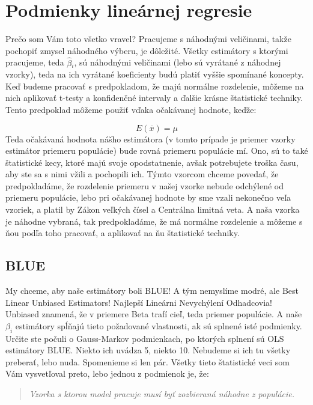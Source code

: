 \hypertarget{podmienky-lineuxe1rnej-regresie}{%
\section{Podmienky lineárnej
regresie}\label{podmienky-lineuxe1rnej-regresie}}

Prečo som Vám toto všetko vravel? Pracujeme s náhodnými veličinami,
takže pochopiť zmysel náhodného výberu, je dôležité. Všetky estimátory s
ktorými pracujeme, teda \(\hat\beta{}_i\), sú náhodnými veličinami (lebo
sú vyrátané z náhodnej vzorky), teda na ich vyrátané koeficienty budú
platiť vyššie spomínané koncepty. Keď budeme pracovať s predpokladom, že
majú normálne rozdelenie, môžeme na nich aplikovať t-testy a konfidenčné
intervaly a ďalšie krásne štatistické techniky. Tento predpoklad môžeme
použiť vďaka očakávanej hodnote, keďže:

\[E(\overline{x}) = \mu\] Teda očakávaná hodnota nášho estimátora (v
tomto prípade je priemer vzorky estimátor priemeru populácie) bude rovná
priemeru populácie mí. Ono, sú to také štatistické kecy, ktoré majú
svoje opodstatnenie, avšak potrebujete troška času, aby ste sa s nimi
vžili a pochopili ich. Týmto vzorcom chceme povedať, že predpokladáme,
že rozdelenie priemeru v našej vzorke nebude odchýlené od priemeru
populácie, lebo pri očakávanej hodnote by sme vzali nekonečno veľa
vzoriek, a platil by Zákon veľkých čísel a Centrálna limitná veta. A
naša vzorka je náhodne vybraná, tak predpokladáme, že má normálne
rozdelenie a môžeme s ňou podľa toho pracovať, a aplikovať na ňu
štatistické techniky.

\hypertarget{blue}{%
\subsection{BLUE}\label{blue}}

My chceme, aby naše estimátory boli BLUE! A tým nemyslíme modré, ale
Best Linear Unbiased Estimators! Najlepší Lineárni Nevychýlení
Odhadcovia! Unbiased znamená, že v priemere Beta trafí cieľ, teda
priemer populácie. A naše \(\beta_i\) estimátory spĺňajú tieto
požadované vlastnosti, ak sú splnené isté podmienky. Určite ste počuli o
Gauss-Markov podmienkach, po ktorých splnení sú OLS estimátory BLUE.
Niekto ich uvádza 5, niekto 10. Nebudeme si ich tu všetky preberať, lebo
nuda. Spomenieme si len pár. Všetky tieto štatistické veci som Vám
vysvetľoval preto, lebo jednou z podmienok je, že:

\begin{center}

\begin{quote}
\emph{Vzorka s ktorou model pracuje musí byť zozbieraná náhodne z
populácie.}
\end{quote}

\end{center}

